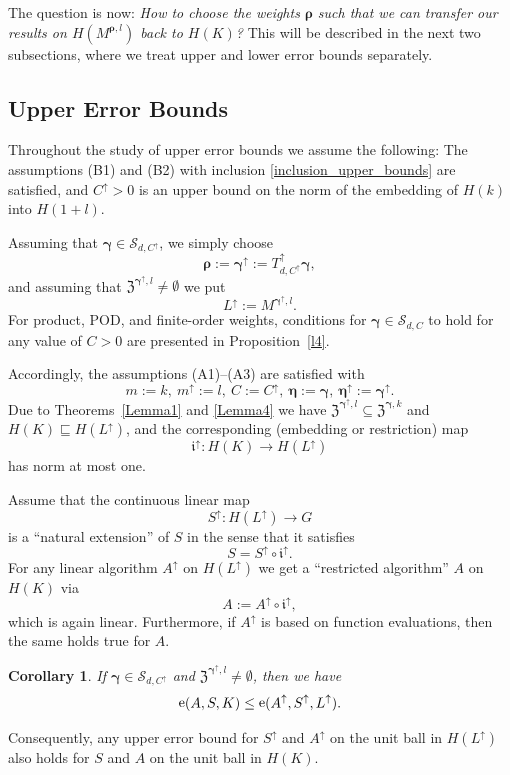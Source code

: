 \documentclass{article}
\newcommand{\bg}{{\boldsymbol{\gamma}}}
\newcommand{\br}{{\boldsymbol{\rho}}}
\newcommand{\be}{{\boldsymbol{\eta}}}
\newcommand{\Z}{{\mathfrak Z}}
\newcommand{\SSS}{\mathcal{S}}
\newcommand{\up}{\uparrow}
\DeclareMathOperator{\err}{{\rm e}}
\theoremstyle{plain}
\newtheorem{corollary}{Corollary}
\theoremstyle{definition}
\begin{document}
The question is now: \emph{How to choose the weights 
$\br$ such that we can transfer our results on 
$H(M^{\br,l})$ back to $H(K)$?}
This will be described in the next two subsections, where we 
treat upper and lower error bounds separately.

\subsection{Upper Error Bounds}

Throughout the study of upper error bounds we assume
the following:
The assumptions (B1) and (B2) with inclusion 
\eqref{inclusion_upper_bounds} are satisfied, and
$C^\up > 0$ is an upper bound on the 
norm of the embedding of $H(k)$ into $H(1+l)$.

Assuming that $\bg \in \SSS_{d,C^\up}$,
we simply choose 
\[
\br := \bg^{\up} := T^{\up}_{d,C^\up} \bg,
\]
and assuming that $\Z^{\bg^\up\!,l} \neq \emptyset$ we put
\[
L^\up := M^{\bg^\up,l}.
\]
For product, POD, and finite-order weights,
conditions for $\bg \in \SSS_{d,C}$ to hold for any value of $C>0$
are presented in Proposition~\ref{l4}.

Accordingly, the assumptions (A1)--(A3) are satisfied with 
\[
m := k,\ m^\up := l,\ C := C^\up,\ \be := \bg,\ \be^\up := \bg^\up.
\]
Due to Theorems~\ref{Lemma1} and \ref{Lemma4} we have 
$\Z^{\bg^\up\!,l} \subseteq \Z^{\bg,k}$ and
$H(K) \sqsubseteq H(L^\up)$,
and the corresponding 
(embedding or restriction) map
\[
\mathfrak{i^\up} \colon H(K) \to H(L^\up)
\]
has norm at most one.

Assume that the continuous linear map
\[
S^{\up} \colon H(L^\up) \to G
\]
is a ``natural extension'' of $S$ in the sense that it satisfies 
\[
S = S^{\up} \circ \mathfrak{i^\up}.
\]
For any linear algorithm $A^{\up}$ on $H(L^\up)$ we get a 
``restricted algorithm'' $A$ on $H(K)$ via
\[
A:= A^{\up}  \circ 
\mathfrak{i^\up},
\]
which is again linear. 
Furthermore, if $A^\up$ is based on function evaluations,
then the same holds true for $A$.

\begin{corollary}\label{c1}
If $\bg \in \SSS_{d,C^\up}$ and
$\Z^{\bg^\up\!,l} \neq \emptyset$, then we have
\[
\err(A, S, K) \leq \err(A^{\up}, S^{\up}, L^\up). 
\]
\end{corollary}

Consequently, any upper error bound for $S^{\up}$ and $A^{\up}$ 
on the unit ball in $H(L^\up)$ also holds for $S$ and $A$ on 
the unit ball in $H(K)$.
\end{document}
